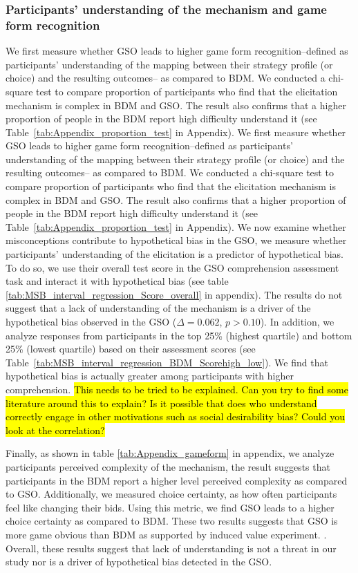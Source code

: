 \documentclass[12pt]{article}
\begin{document}
\subsubsection{Participants' understanding of the mechanism and game form recognition}We first measure whether GSO leads to higher game form recognition--defined as participants’ understanding of the mapping between their strategy profile (or choice) and the resulting outcomes--  as compared to BDM. We conducted a chi-square test to compare proportion of participants who find that the elicitation mechanism is complex in BDM and GSO. The result also confirms that a higher proportion of people in the BDM report high difficulty understand it (see Table~\ref{tab:Appendix_proportion_test} in Appendix).
We first measure whether GSO leads to higher game form recognition--defined as participants’ understanding of the mapping between their strategy profile (or choice) and the resulting outcomes--  as compared to BDM. We conducted a chi-square test to compare proportion of participants who find that the elicitation mechanism is complex in BDM and GSO. The result also confirms that a higher proportion of people in the BDM report high difficulty understand it (see Table~\ref{tab:Appendix_proportion_test} in Appendix).
We now examine whether misconceptions contribute to hypothetical bias in the GSO, we measure whether participants' understanding of the elicitation is a predictor of hypothetical bias. To do so, we use their overall test score in the GSO comprehension assessment task and interact it with hypothetical bias (see table \ref{tab:MSB_interval_regression_Score_overall} in appendix). The results do not suggest that a lack of understanding of the mechanism is a driver of the hypothetical bias observed in the GSO (\(\Delta = 0.062\), \(p > 0.10\)). In addition, we analyze responses from participants in the top 25\% (highest quartile) and bottom 25\% (lowest quartile) based on their assessment scores (see Table~\ref{tab:MSB_interval_regression_BDM_Scorehigh_low}).  We find that hypothetical bias is actually greater among participants with higher comprehension. \hl{This needs to be tried to be explained. Can you try to find some literature around this to explain? Is it possible that does who understand correctly engage in other motivations such as social desirability bias? Could you look at the correlation?}

Finally, as shown in table \ref{tab:Appendix_gameform} in appendix,  we analyze participants perceived complexity of the mechanism, the result suggests that participants in the BDM report a higher level perceived complexity as compared to GSO. Additionally, we measured choice certainty, as how often participants feel like changing their bids. Using this metric, we find GSO leads to a higher choice certainty as compared to BDM. These two results suggests that GSO is more game obvious than BDM as supported by induced value experiment.  \citep{chakraborty_future_2025,brown_is_2023}.
Overall, these results suggest that lack of understanding is not a threat in our study nor is a driver of hypothetical bias detected in the GSO.
\end{document}
